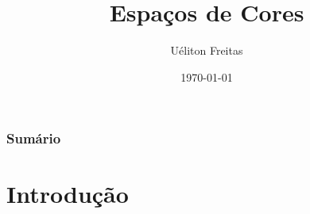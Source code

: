 \documentclass{beamer}
\title[Computação Gráfica]{Espaços de Cores} %
\author{Uéliton Freitas} %
\institute[UFMS] %
{
Universidade Católica Dom Bosco - UCDB \\ %
\medskip
\textit{freitas.ueliton@gmail.com} %
}
\date{\today} %
\begin{document}
\begin{frame}
\titlepage %
\end{frame}

\begin{frame}
\frametitle{Sumário} %
\tableofcontents %
\end{frame}





\section{Introdução} 

\end{document}
